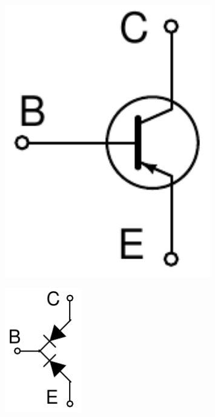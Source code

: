 \documentclass[beamer]{standalone}
\begin{document}
\begin{frame}
\begin{columns}[t]
\begin{column}{.5\textwidth}
\begin{columns}[t]
   \begin{column}{.60\textwidth}
    \begin{figure}
     \includegraphics[width=0.80\textwidth]{./schematics/pnp_transistor.pdf}
    \end{figure}
    \begin{figure}
     \includegraphics[width=0.30\textwidth]{./schematics/pnp_diodes.pdf}
    \end{figure}
   \end{column}
  \end{columns}
 \end{column}
\end{columns}
\end{frame}
\end{document}
